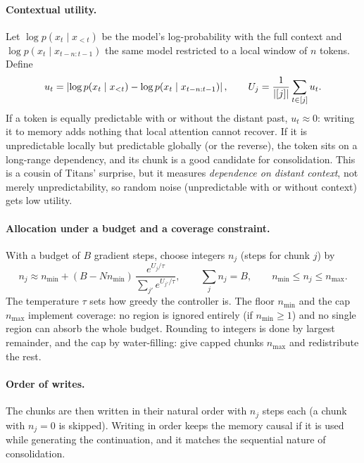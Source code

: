 \paragraph{Contextual utility.} Let $\log p(x_t\mid x_{<t})$ be the model's log-probability with
the full context and $\log p(x_t\mid x_{t-n:t-1})$ the same model restricted to a local window
of $n$ tokens. Define
\begin{equation}\label{eq:c09-utility}
  u_t = \left\lvert \log p(x_t\mid x_{<t}) - \log p(x_t\mid x_{t-n:t-1})\right\rvert, \qquad
  U_j = \frac{1}{\left\lvert [j]\right\rvert}\sum_{t\in[j]}u_t .
\end{equation}
If a token is equally predictable with or without the distant past, $u_t \approx 0$: writing it
to memory adds nothing that local attention cannot recover. If it is unpredictable locally but
predictable globally (or the reverse), the token sits on a long-range dependency, and its chunk
is a good candidate for consolidation. This is a cousin of Titans' surprise, but it measures
\emph{dependence on distant context}, not merely unpredictability, so random noise (unpredictable
with or without context) gets low utility.

\paragraph{Allocation under a budget and a coverage constraint.} With a budget of $B$ gradient
steps, choose integers $n_j$ (steps for chunk $j$) by
\begin{equation}\label{eq:c09-alloc}
  n_j \approx n_{\min} + (B - N n_{\min})\,\frac{e^{U_j/\tau}}{\sum_{j'}e^{U_{j'}/\tau}}, \qquad
  \sum_j n_j = B, \qquad n_{\min} \le n_j \le n_{\max}.
\end{equation}
The temperature $\tau$ sets how greedy the controller is. The floor $n_{\min}$ and the cap
$n_{\max}$ implement coverage: no region is ignored entirely (if $n_{\min} \ge 1$) and no single
region can absorb the whole budget. Rounding to integers is done by largest remainder, and the
cap by water-filling: give capped chunks $n_{\max}$ and redistribute the rest.

\paragraph{Order of writes.} The chunks are then written in their natural order with $n_j$ steps
each (a chunk with $n_j = 0$ is skipped). Writing in order keeps the memory causal if it is used
while generating the continuation, and it matches the sequential nature of consolidation.

